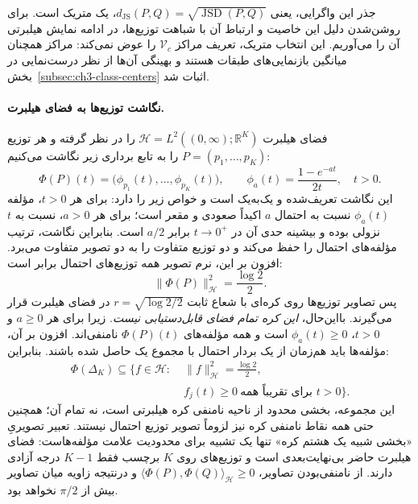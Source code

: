 جذر این واگرایی، یعنی $d_{\mathrm{JS}}(P,Q)=\sqrt{\operatorname{JSD}(P,Q)}$، یک متریک است. برای روشن‌شدن دلیل این خاصیت و ارتباط آن با شباهت توزیع‌ها، در ادامه نمایش هیلبرتی آن را می‌آوریم. این انتخاب متریک، تعریف مراکز $\mathcal V_c$ را عوض نمی‌کند: مراکز همچنان میانگین بازنمایی‌های طبقات هستند و بهینگی آن‌ها از نظر درست‌نمایی در بخش~\ref{subsec:ch3-class-centers} اثبات شد.

\paragraph{نگاشت توزیع‌ها به فضای هیلبرت.}
فضای هیلبرت $\mathcal H=L^2((0,\infty);\mathbb R^K)$ را در نظر گرفته و هر توزیع $P=(p_1,\ldots,p_K)$ را به تابع برداری زیر نگاشت می‌کنیم:
\begin{equation}\label{eq:ch3-js-Hilbert-map}
\boxed{
\Phi(P)(t)=
\bigl(\phi_{p_1}(t),\ldots,\phi_{p_K}(t)\bigr),
\qquad
\phi_a(t)=\frac{1-e^{-at}}{2t},\quad t>0.
}
\end{equation}
این نگاشت تعریف‌شده و یک‌به‌یک است و خواص زیر را دارد: برای هر $t>0$، مؤلفه $\phi_a(t)$ نسبت به احتمال $a$ اکیداً صعودی و مقعر است؛ برای هر $a>0$، نسبت به $t$ نزولی بوده و بیشینه حدی آن در $t\to0^+$ برابر $a/2$ است. بنابراین نگاشت، ترتیب مؤلفه‌های احتمال را حفظ می‌کند و دو توزیع متفاوت را به دو تصویر متفاوت می‌برد. افزون بر این، نرم تصویر همه توزیع‌های احتمال برابر است:
\[
\|\Phi(P)\|_{\mathcal H}^2=\frac{\log2}{2}.
\]
پس تصاویر توزیع‌ها روی کره‌ای با شعاع ثابت
$r=\sqrt{\log2/2}$ در فضای هیلبرت قرار می‌گیرند.
بااین‌حال، \emph{این کره تمام فضای قابل‌دستیابی نیست}.
زیرا برای هر $a\ge0$ و $t>0$،
$\phi_a(t)\ge0$ است و همه مؤلفه‌های
$\Phi(P)(t)$ نامنفی‌اند. افزون بر آن،
مؤلفه‌ها باید هم‌زمان از یک بردار احتمال
با مجموع یک حاصل شده باشند. بنابراین:
\begin{equation}\label{eq:ch3-js-positive-spherical-image}
\boxed{
\begin{aligned}
\Phi(\Delta_K)\subseteq\bigl\{f\in\mathcal H:\;&
\|f\|_{\mathcal H}^{2}=\tfrac{\log2}{2},\\[-1pt]
& f_j(t)\ge0\
\text{برای تقریباً همه }t>0\bigr\}.
\end{aligned}
}
\end{equation}
این مجموعه، بخشی محدود از ناحیه نامنفی
کره هیلبرتی است، نه تمام آن؛
همچنین حتی همه نقاط نامنفی کره نیز
لزوماً تصویر توزیع احتمال نیستند.
تعبیر تصویریِ «بخشی شبیه یک هشتم کره»
تنها یک تشبیه برای محدودیت علامت مؤلفه‌هاست:
فضای هیلبرت حاضر بی‌نهایت‌بعدی است و
توزیع‌های روی $K$ برچسب فقط
$K-1$ درجه آزادی دارند.
از نامنفی‌بودن تصاویر،
$\langle\Phi(P),\Phi(Q)\rangle_{\mathcal H}\ge0$
و درنتیجه زاویه میان تصاویر
بیش از $\pi/2$ نخواهد بود.

